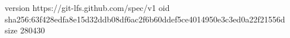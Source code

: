 version https://git-lfs.github.com/spec/v1
oid sha256:63f428edfa8e15d32ddb08df6ac2f6b60ddef5ce4014950e3c3ed0a22f21556d
size 280430
